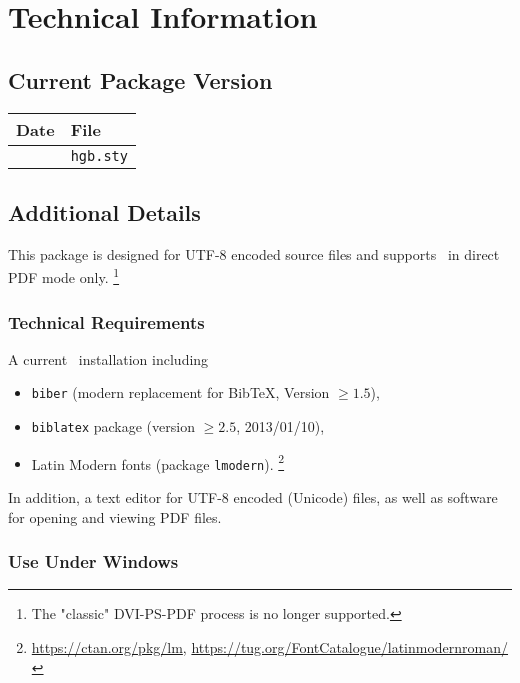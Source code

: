 \chapter{Technical Information}
\label{app:TechnicalDetails}

\section{Current Package Version}

\begin{center}
	\begin{tabular}{@{}ll@{}}
		\toprule
		Date   & File            \\
		\midrule
		\hgbDate & \texttt{hgb.sty} \\
		\bottomrule
	\end{tabular}
\end{center}


\section{Additional Details}

This package is designed for \mbox{UTF-8} encoded source files and supports 
\latex\ in direct PDF mode only.%
\footnote{The "classic" DVI-PS-PDF process is no longer supported.}


\subsection{Technical Requirements}

A current \latex\ installation including
%
\begin{itemize}
		\item \texttt{biber} (modern replacement for BibTeX, Version $\geq 1.5$),
		\item \texttt{biblatex} package (version $\geq 2.5$, 2013/01/10),
		\item Latin Modern fonts (package \texttt{lmodern}).%
			\footnote{\url{https://ctan.org/pkg/lm},
				\url{https://tug.org/FontCatalogue/latinmodernroman/}}
\end{itemize}
%
In addition, a text editor for {UTF-8} encoded (Unicode) files, as well 
as software for opening and viewing PDF files.



\subsection{Use Under Windows}
\label{sec:UseUnderWindows}

